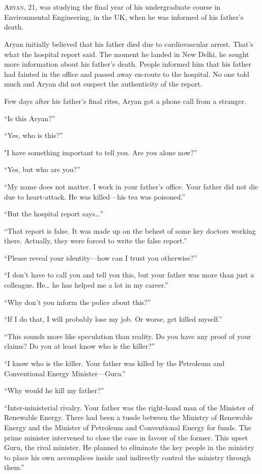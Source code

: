 \chapter{}

\lettrine{A}{ryan}, 21, was studying the final year of his undergraduate course
in Environmental Engineering, in the UK, when he was informed of his father's
death.

Aryan initially believed that his father died due to cardiovascular arrest.
That's what the hospital report said. The moment he landed in New Delhi, he
sought more information about his father's death. People informed him that his
father had fainted in the office and passed away en-route to the hospital. No
one told much and Aryan did not suspect the authenticity of the report.

Few days after his father's final rites, Aryan got a phone call from a stranger.

“Is this Aryan?”

“Yes, who is this?”

"I have something important to tell you. Are you alone now?”

“Yes, but who are you?”

“My name does not matter. I work in your father's office. Your father did not
die due to heart-attack. He was killed—his tea was poisoned.”

“But the hospital report says…”

“That report is false. It was made up on the behest of some key doctors working
there. Actually, they were forced to write the false report.”

“Please reveal your identity—how can I trust you otherwise?”

“I don't have to call you and tell you this, but your father was more than just
a colleague. He… he has helped me a lot in my career.”

“Why don't you inform the police about this?”

“If I do that, I will probably lose my job. Or worse, get killed myself.”

“This sounds more like speculation than reality. Do you have any proof of your
claims? Do you at least know who is the killer?”

“I know who is the killer. Your father was killed by the Petroleum and
Conventional Energy Minister—Guru.”

“Why would he kill my father?”

“Inter-ministerial rivalry. Your father was the right-hand man of the Minister
of Renewable Energy. There had been a tussle between the Ministry of Renewable Energy
and the Minister of Petroleum and Conventional Energy for funds. The prime minister
intervened to close the case in favour of the former. This
upset Guru, the rival minister. He planned to eliminate the key people in the
ministry to place his own accomplices inside and indirectly
control the ministry through them.”

